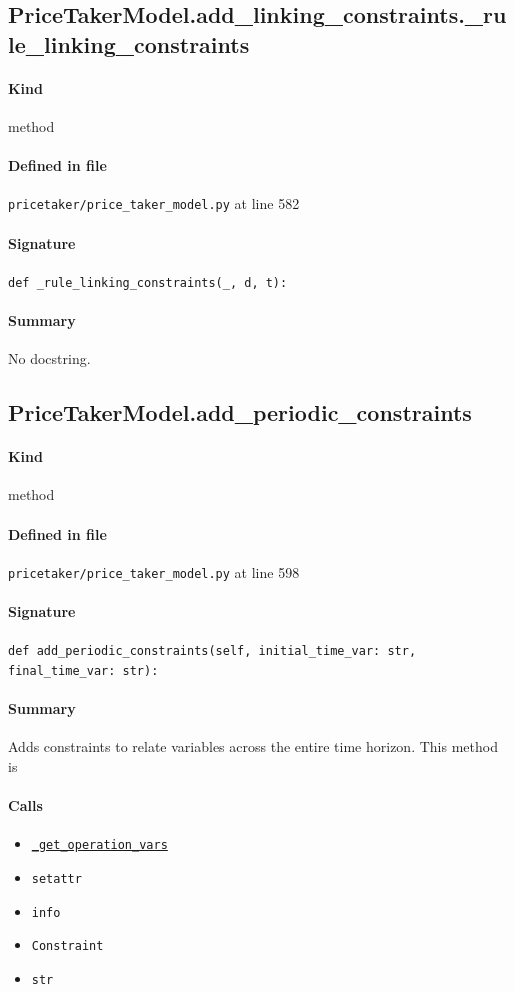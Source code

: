 \documentclass[11pt]{report}
\begin{document}
\subsection{PriceTakerModel.add\_linking\_constraints.\_rule\_linking\_constraints}
\label{def:pricetaker-price_taker_model.py:PriceTakerModel.add_linking_constraints._rule_linking_constraints:L582}
\paragraph{Kind} method
\paragraph{Defined in file} \texttt{pricetaker/price\_taker\_model.py} at line 582
\paragraph{Signature} \texttt{def \_rule\_linking\_constraints(\_, d, t):}
\paragraph{Summary} No docstring.
\subsection{PriceTakerModel.add\_periodic\_constraints}
\label{def:pricetaker-price_taker_model.py:PriceTakerModel.add_periodic_constraints:L598}
\paragraph{Kind} method
\paragraph{Defined in file} \texttt{pricetaker/price\_taker\_model.py} at line 598
\paragraph{Signature} \texttt{def add\_periodic\_constraints(self, initial\_time\_var: str, final\_time\_var: str):}
\paragraph{Summary} Adds constraints to relate variables across the entire time horizon. This method is
\paragraph{Calls}
\begin{itemize}[leftmargin=*]
  \item \hyperref[def:pricetaker-price_taker_model.py:PriceTakerModel._get_operation_vars:L482]{\texttt{\_get\_operation\_vars}}
  \item \texttt{setattr}
  \item \texttt{info}
  \item \texttt{Constraint}
  \item \texttt{str}
\end{itemize}
\end{document}

